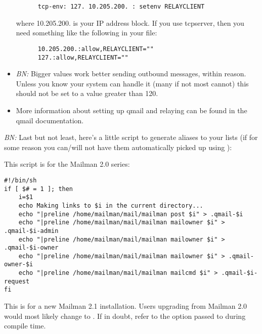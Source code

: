 \documentclass{howto}
\begin{document}
\begin{itemize}
\begin{verbatim}
      tcp-env: 127. 10.205.200. : setenv RELAYCLIENT
\end{verbatim}

      where 10.205.200. is your IP address block.  If you use tcpserver, then
      you need something like the following in your  file:

\begin{verbatim}
      10.205.200.:allow,RELAYCLIENT=""
      127.:allow,RELAYCLIENT=""
\end{verbatim}

\item \emph{BN:} Bigger  values
      work better sending outbound messages, within reason.  Unless you know
      your system can handle it (many if not most cannot) this should not be
      set to a value greater than 120.

\item More information about setting up qmail and relaying can be found in the
      qmail documentation.
\end{itemize}

\emph{BN:} Last but not least, here's a little script to generate aliases to
your lists (if for some reason you can/will not have them automatically picked
up using ):

This script is for the Mailman 2.0 series:

\begin{verbatim}
#!/bin/sh
if [ $# = 1 ]; then
    i=$1
    echo Making links to $i in the current directory...
    echo "|preline /home/mailman/mail/mailman post $i" > .qmail-$i
    echo "|preline /home/mailman/mail/mailman mailowner $i" > .qmail-$i-admin
    echo "|preline /home/mailman/mail/mailman mailowner $i" > .qmail-$i-owner
    echo "|preline /home/mailman/mail/mailman mailowner $i" > .qmail-owner-$i
    echo "|preline /home/mailman/mail/mailman mailcmd $i" > .qmail-$i-request
fi
\end{verbatim}

\begin{notice}[note]
This is for a new Mailman 2.1 installation.  Users upgrading from
Mailman 2.0 would most likely change  to
.  If in doubt, refer to the 
option passed to  during compile time.
\end{notice}
\end{document}
